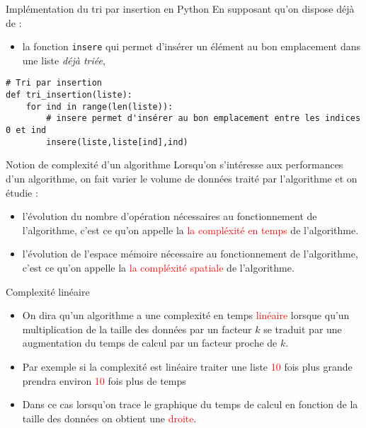 \documentclass[10pt]{beamer}
\begin{document}
\begin{frame}[fragile]
	\mframe{\Algotris}
	\begin{block}{Implémentation du tri par insertion en Python}
		En supposant qu'on dispose déjà de :
		\begin{itemize}
			\item la fonction \texttt{insere} qui permet d'insérer un élément au bon emplacement dans une liste \textit{déjà triée},
		\end{itemize}
		\begin{lstlisting}
# Tri par insertion
def tri_insertion(liste):
    for ind in range(len(liste)):
        # insere permet d'insérer au bon emplacement entre les indices 0 et ind
        insere(liste,liste[ind],ind)
\end{lstlisting}
	\end{block}
\end{frame}


\begin{frame}
	\mframe{\Algotris}
	\begin{block}{Notion de complexité d'un algorithme}
		Lorsqu'on s'intéresse aux performances d'un algorithme, on fait varier le volume de données traité par l'algorithme et on étudie :
		\begin{itemize}
			\item<2-> l'évolution du nombre d'opération nécessaires au fonctionnement de l'algorithme, c'est ce qu'on appelle la \textcolor{red}{la compléxité en temps} de l'algorithme.
			\item<3-> l'évolution de l'espace mémoire nécessaire au fonctionnement de l'algorithme, c'est ce qu'on appelle la \textcolor{red}{la compléxité spatiale} de l'algorithme.
		\end{itemize}
	\end{block}
\end{frame}

\begin{frame}
	\mframe{\Algotris}
	\begin{block}{Complexité linéaire}
		\begin{itemize}
			\item<2-> On dira qu'un algorithme a une complexité en temps \textcolor{red}{linéaire} lorsque qu'un multiplication de la taille des données par un facteur $k$ se traduit par une augmentation du temps de calcul par un facteur proche de $k$.
			\item<3-> Par exemple si la complexité est linéaire traiter une liste \textcolor{red}{10} fois plus grande prendra environ \textcolor{red}{10} fois plus de temps
			\item<4-> Dans ce cas lorsqu'on trace le graphique du temps de calcul en fonction de la taille des données on obtient une \textcolor{red}{droite}.
		\end{itemize}
	\end{block}
\end{frame}
\end{document}
